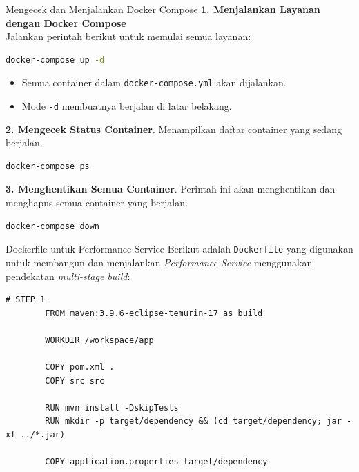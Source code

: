 \documentclass[aspectratio=169, table]{beamer}
\begin{document}
\begin{frame}[fragile]{Mengecek dan Menjalankan Docker Compose}
	\vspace{20pt}
	\textbf{1. Menjalankan Layanan dengan Docker Compose} \\
	Jalankan perintah berikut untuk memulai semua layanan:
	\begin{lstlisting}[language=bash]
		docker-compose up -d
	\end{lstlisting}
	\begin{itemize}
		\item Semua container dalam \texttt{docker-compose.yml} akan dijalankan.
		\item Mode \texttt{-d} membuatnya berjalan di latar belakang.
	\end{itemize}
	
	\textbf{2. Mengecek Status Container}. Menampilkan daftar container yang sedang berjalan. \\
	\begin{lstlisting}[language=bash]
		docker-compose ps
	\end{lstlisting}
	
	\textbf{3. Menghentikan Semua Container}. Perintah ini akan menghentikan dan menghapus semua container yang berjalan. \\
	\begin{lstlisting}[language=bash]
		docker-compose down
	\end{lstlisting}
\end{frame}

\begin{frame}[fragile]{Dockerfile untuk Performance Service}
	\vspace{20pt}
	Berikut adalah \texttt{Dockerfile} yang digunakan untuk membangun dan menjalankan \textit{Performance Service} menggunakan pendekatan \textit{multi-stage build}:
	
	\begin{lstlisting}[language=docker]
		# STEP 1
		FROM maven:3.9.6-eclipse-temurin-17 as build
		
		WORKDIR /workspace/app
		
		COPY pom.xml .
		COPY src src
		
		RUN mvn install -DskipTests
		RUN mkdir -p target/dependency && (cd target/dependency; jar -xf ../*.jar)
		
		COPY application.properties target/dependency
	\end{lstlisting}
\end{frame}
\end{document}
